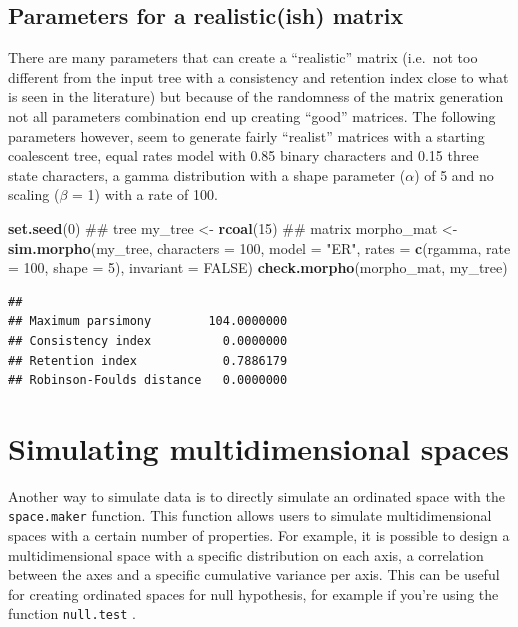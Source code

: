 \documentclass[]{book}
\newenvironment{Shaded}{\begin{snugshade}}{\end{snugshade}}
\newcommand{\KeywordTok}[1]{\textcolor[rgb]{0.13,0.29,0.53}{\textbf{#1}}}
\newcommand{\DataTypeTok}[1]{\textcolor[rgb]{0.13,0.29,0.53}{#1}}
\newcommand{\DecValTok}[1]{\textcolor[rgb]{0.00,0.00,0.81}{#1}}
\newcommand{\StringTok}[1]{\textcolor[rgb]{0.31,0.60,0.02}{#1}}
\newcommand{\OtherTok}[1]{\textcolor[rgb]{0.56,0.35,0.01}{#1}}
\newcommand{\NormalTok}[1]{#1}
\theoremstyle{definition}
\theoremstyle{definition}
\theoremstyle{remark}
\begin{document}
\subsection{Parameters for a realistic(ish)
matrix}\label{parameters-for-a-realisticish-matrix}

There are many parameters that can create a ``realistic'' matrix
(i.e.~not too different from the input tree with a consistency and
retention index close to what is seen in the literature) but because of
the randomness of the matrix generation not all parameters combination
end up creating ``good'' matrices. The following parameters however,
seem to generate fairly ``realist'' matrices with a starting coalescent
tree, equal rates model with 0.85 binary characters and 0.15 three state
characters, a gamma distribution with a shape parameter (\(\alpha\)) of
5 and no scaling (\(\beta\) = 1) with a rate of 100.

\begin{Shaded}
\begin{Highlighting}[]
\KeywordTok{set.seed}\NormalTok{(}\DecValTok{0}\NormalTok{)}
\NormalTok{## tree}
\NormalTok{my_tree <-}\StringTok{ }\KeywordTok{rcoal}\NormalTok{(}\DecValTok{15}\NormalTok{)}
\NormalTok{## matrix}
\NormalTok{morpho_mat <-}\StringTok{ }\KeywordTok{sim.morpho}\NormalTok{(my_tree, }\DataTypeTok{characters =} \DecValTok{100}\NormalTok{, }\DataTypeTok{model =} \StringTok{"ER"}\NormalTok{,}
    \DataTypeTok{rates =} \KeywordTok{c}\NormalTok{(rgamma, }\DataTypeTok{rate =} \DecValTok{100}\NormalTok{, }\DataTypeTok{shape =} \DecValTok{5}\NormalTok{), }\DataTypeTok{invariant =} \OtherTok{FALSE}\NormalTok{)}
\KeywordTok{check.morpho}\NormalTok{(morpho_mat, my_tree)}
\end{Highlighting}
\end{Shaded}

\begin{verbatim}
##                                     
## Maximum parsimony        104.0000000
## Consistency index          0.0000000
## Retention index            0.7886179
## Robinson-Foulds distance   0.0000000
\end{verbatim}

\section{Simulating multidimensional
spaces}\label{simulating-multidimensional-spaces}

Another way to simulate data is to directly simulate an ordinated space
with the \texttt{space.maker} function. This function allows users to
simulate multidimensional spaces with a certain number of properties.
For example, it is possible to design a multidimensional space with a
specific distribution on each axis, a correlation between the axes and a
specific cumulative variance per axis. This can be useful for creating
ordinated spaces for null hypothesis, for example if you're using the
function \texttt{null.test} \citep{diaz2016global}.
\end{document}
